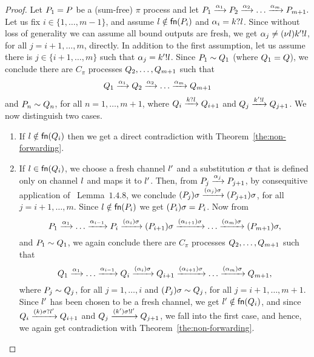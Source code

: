 \begin{proof}
Let $P_1=P$ be a (sum-free) $\pi$ process and let $P_1\xrightarrow{\alpha_1}P_2\xrightarrow{\alpha_2}\ldots\xrightarrow{\alpha_{m}}P_{m+1}.$
Let us fix $i\in\{1,\ldots, m-1\}$, and assume $l\notin\mathsf{fn}(P_i)$ and $\alpha_i=k?l$. Since without loss of generality we can assume all bound outputs are fresh, we get $\alpha_j\not=(\nu l)k'!l$, for all $j=i+1, \ldots,m$, directly. 
In addition to the first assumption, let us assume there is $j\in\{i+1, \ldots,m\}$ such that $\alpha_j=k'!l$. 
Since $P_1\sim Q_1$ (where $Q_1=Q$), we conclude there are $C_\pi$ processes $Q_2, \ldots, Q_{m+1}$ such that
\[
Q_1\xrightarrow{\alpha_1}Q_2\xrightarrow{\alpha_2}\ldots\xrightarrow{\alpha_{m}}Q_{m+1}
\] 
and $P_n\sim Q_n$, for all $n=1,\ldots,m+1$, where $Q_i\xrightarrow{k?l}Q_{i+1}$ and $Q_j\xrightarrow{k'!l}Q_{j+1}$. 
We now distinguish two cases.
\begin{enumerate}
\item If $l\notin\mathsf{fn}(Q_i)$ then we get a direct contradiction with Theorem~\ref{the:non-forwarding}. 
\item If $l\in\mathsf{fn}(Q_i)$, we choose a fresh channel $l'$ and a substitution $\sigma$ that is defined only on channel $l$ and maps it to $l'$. Then, from $P_j\xrightarrow{\alpha_j}P_{j+1}$, by consequitive application of~\cite{pi_calculus} Lemma~$1.4.8$, we conclude $(P_j)\sigma\xrightarrow{(\alpha_j)\sigma}(P_{j+1})\sigma$, for all $j=i+1, \ldots,m$. Since $l\notin\mathsf{fn}(P_i)$ we get $(P_i)\sigma=P_i$.
Now from 
\[
P_1\xrightarrow{\alpha_1}\ldots\xrightarrow{\alpha_{i-1}}P_i\xrightarrow{(\alpha_i)\sigma}(P_{i+1})\sigma\xrightarrow{(\alpha_{i+1})\sigma}\ldots\xrightarrow{(\alpha_{m})\sigma}(P_{m+1})\sigma,
\]
and $P_1\sim Q_1$, we again conclude there are $C_\pi$ processes $Q_2, \ldots, Q_{m+1}$ such that
\[
Q_1\xrightarrow{\alpha_1}\ldots\xrightarrow{\alpha_{i-1}}Q_i\xrightarrow{(\alpha_i)\sigma}Q_{i+1}\xrightarrow{(\alpha_{i+1})\sigma}\ldots\xrightarrow{(\alpha_{m})\sigma}Q_{m+1},
\]
where $P_j\sim Q_j$, for all $j=1,\ldots,i$ and $(P_j)\sigma\sim Q_j$, for all $j=i+1,\ldots,m+1$. 
Since $l'$ has been chosen to be a fresh channel, we get $l'\notin\mathsf{fn}(Q_i)$, and since  $Q_i\xrightarrow{(k)\sigma?l'}Q_{i+1}$ and $Q_j\xrightarrow{(k')\sigma!l'}Q_{j+1}$, we fall into the first case, and hence, we again get contradiction with Theorem~\ref{the:non-forwarding}. 

\end{enumerate}
\end{proof}


